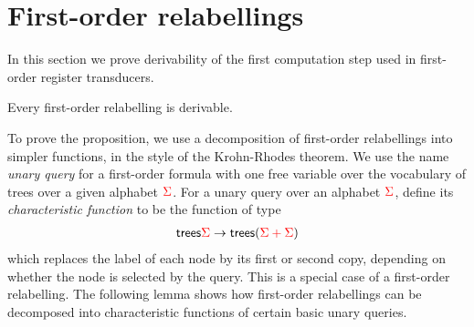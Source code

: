 \section{First-order  relabellings}\label{sec:fo-translation}
In this section we prove derivability of the first computation step used in first-order register transducers.
\begin{proposition} \label{prop:forat}    
    Every first-order relabelling is derivable.
\end{proposition}
To prove the proposition, we use a decomposition of first-order relabellings into simpler functions, in the style of the Krohn-Rhodes theorem. 
We use the name \emph{unary query} for a first-order formula with one free variable over the vocabulary of trees over a given alphabet ${\color{red}{\Sigma}}$. 
For a  unary query  over an alphabet ${\color{red}{\Sigma}}$,  define its  \emph{characteristic function} to be the function of type
\begin{align*}
 \mathsf {trees} {\color{red}{\Sigma}} \to \mathsf {trees} ({\color{red}{{\color{red}{\Sigma}}+ {\color{red}{\Sigma}}}})
\end{align*}
which replaces the label of each node by its first or second copy, depending on whether the node is selected by the query. This is a special case of a first-order relabelling. The following lemma  shows how first-order relabellings can  be decomposed into characteristic functions of certain basic unary queries.

